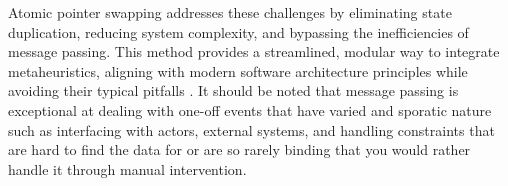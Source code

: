 Atomic pointer swapping addresses these challenges by eliminating state
duplication, reducing system complexity, and bypassing the inefficiencies of
message passing. This method provides a streamlined, modular way to integrate
metaheuristics, aligning with modern software architecture principles while
avoiding their typical pitfalls \citep{richards_fundamentals_2020}. It should
be noted that message passing is exceptional at dealing with one-off events that
have varied and sporatic nature such as interfacing with actors, external
systems, and handling constraints that are hard to find the data for or are 
so rarely binding that you would rather handle it through manual intervention.

